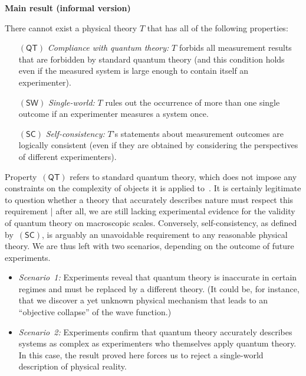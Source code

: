 \documentclass[12pt]{article}
\theoremstyle{plain}
\theoremstyle{definition}
\newcommand*{\QT}{\mathsf{(QT)}}
\newcommand*{\SW}{\mathsf{(SW)}}
\newcommand*{\SelfCons}{\mathsf{(SC)}}
\begin{document}
 \begin{shaded}
 \noindent \textbf{Main result (informal version)} \vspace{1ex}

 \noindent There cannot exist a physical theory $T$ that has all of the following properties: \vspace{-0.8ex}
  \begin{enumerate}[itemindent=0cm,labelsep=0.2cm,leftmargin=1.0cm] 
    \setlength{\itemsep}{0ex}
    \item[$\QT$]   \emph{Compliance with quantum theory:} $T$ forbids all measurement results that are forbidden by standard quantum theory (and this condition holds even if the measured system is large enough to contain itself an experimenter).
    \item[$\SW$]  \emph{Single-world:} $T$ rules out the occurrence of more than one single outcome if an experimenter measures a system once.
          \item[$\SelfCons$]  \emph{Self-consistency:} $T$'s statements about measurement outcomes are logically consistent (even if they are obtained by considering the perspectives of different experimenters).
              \end{enumerate} \vspace{-2ex}
 \end{shaded}
 
Property~$\QT$ refers to standard quantum theory, which does not impose any constraints on the complexity of objects it is applied to~\cite{Deutsch85}.  It is certainly legitimate to question whether a theory that accurately describes nature must respect this requirement | after all, we are still lacking experimental evidence for the validity of quantum theory on macroscopic scales.  Conversely, self-consistency, as defined by~$\SelfCons$, is arguably an unavoidable requirement to any reasonable physical theory.  We are thus left with two scenarios, depending on the outcome of future experiments. 
\begin{itemize}
  \item \emph{Scenario~1:} Experiments reveal that quantum theory is inaccurate in certain regimes and must be replaced by a different theory. (It could be, for instance, that we discover a yet unknown physical mechanism that leads to an ``objective collapse'' of the wave function.)
  \item \emph{Scenario~2:} Experiments confirm that quantum theory accurately describes systems as complex as experimenters who themselves apply quantum theory.  In this case, the result proved here forces us to reject a single-world description of physical reality. 
 \end{itemize}
\end{document}
